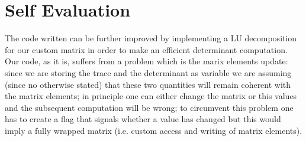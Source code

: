 \documentclass{article}
\begin{document}
\section*{Self Evaluation}
The code written can be further improved by implementing a LU decomposition for our custom matrix in order to make an efficient determinant computation. Our code, as it is, suffers from a problem which is the marix elements update: since we are storing the trace and the determinant as variable we are assuming (since no otherwise stated) that these two quantities will remain coherent with the matrix elements; in principle one can either change the matrix or this values and the subsequent computation will be wrong; to circumvent this problem one has to create a flag that signals whether a value has changed but this would imply a fully wrapped matrix (i.e. custom access and writing of matrix elements).  
\end{document}

